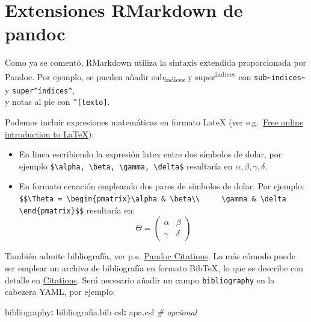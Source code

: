 \documentclass[
]{book}
\newenvironment{Shaded}{\begin{snugshade}}{\end{snugshade}}
\newcommand{\AttributeTok}[1]{\textcolor[rgb]{0.77,0.63,0.00}{#1}}
\newcommand{\CommentTok}[1]{\textcolor[rgb]{0.56,0.35,0.01}{\textit{#1}}}
\newcommand{\FunctionTok}[1]{\textcolor[rgb]{0.00,0.00,0.00}{#1}}
\newcommand{\KeywordTok}[1]{\textcolor[rgb]{0.13,0.29,0.53}{\textbf{#1}}}
\theoremstyle{break}
\theoremstyle{nonumberplain}
\begin{document}
\hypertarget{extensiones-rmarkdown-de-pandoc}{%
\section{Extensiones RMarkdown de pandoc}\label{extensiones-rmarkdown-de-pandoc}}

Como ya se comentó, RMarkdown utiliza la sintaxis extendida proporcionada por Pandoc.
Por ejemplo, se pueden añadir sub\textsubscript{índices} y super\textsuperscript{índices} con \texttt{sub\textasciitilde{}índices\textasciitilde{}} y \texttt{super\^{}índices\^{}},\\
y notas al pie con \texttt{\^{}{[}texto{]}}.

Podemos incluir expresiones matemáticas en formato LateX (ver e.g.~\href{https://www.overleaf.com/learn/latex/Free_online_introduction_to_LaTeX_(part_1)}{Free online introduction to LaTeX}):

\begin{itemize}
\item
  En linea escribiendo la expresión latex entre dos símbolos de dolar,
  por ejemplo \texttt{\$\textbackslash{}alpha,\ \textbackslash{}beta,\ \textbackslash{}gamma,\ \textbackslash{}delta\$}
  resultaría en \(\alpha, \beta, \gamma, \delta\).
\item
  En formato ecuación empleando dos pares de símbolos de dolar. Por ejemplo:
  \texttt{\$\$\textbackslash{}Theta\ =\ \textbackslash{}begin\{pmatrix\}\textbackslash{}alpha\ \&\ \textbackslash{}beta\textbackslash{}\textbackslash{}\ \ \ \ \ \textbackslash{}gamma\ \&\ \textbackslash{}delta\ \ \ \ \ \textbackslash{}end\{pmatrix\}\$\$}
  resultaría en:
  \[\Theta = \begin{pmatrix}\alpha & \beta\\
  \gamma & \delta
  \end{pmatrix}\]
\end{itemize}

También admite bibliografía, ver p.e. \href{https://pandoc.org/MANUAL.html\#citations}{Pandoc Citations}.
Lo más cómodo puede ser emplear un archivo de bibliografía en formato BibTeX, lo que se describe con detalle en \href{https://bookdown.org/yihui/bookdown/citations.html}{Citations}.
Será necesario añadir un campo \texttt{bibliography} en la cabezera YAML, por ejemplo:

\begin{Shaded}
\begin{Highlighting}[]
\FunctionTok{bibliography}\KeywordTok{:}\AttributeTok{ bibliografia.bib}
\FunctionTok{csl}\KeywordTok{:}\AttributeTok{ apa.csl}\CommentTok{  \# opcional}
\end{Highlighting}
\end{Shaded}
\end{document}
